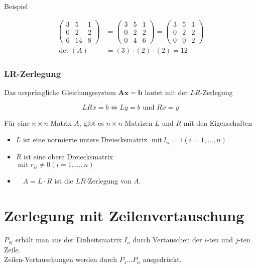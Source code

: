 Beispiel

$$
\begin{aligned}
\left(\begin{array}{ccc}
3 & 5 & 1 \\
0 & 2 & 2 \\
6 & 14 & 8
\end{array}\right) & =\left(\begin{array}{lll}
3 & 5 & 1 \\
0 & 2 & 2 \\
0 & 4 & 6
\end{array}\right)=\left(\begin{array}{lll}
3 & 5 & 1 \\
0 & 2 & 2 \\
0 & 0 & 2
\end{array}\right) \\
\operatorname{det}(A) & =(3) \cdot(2) \cdot(2)=12
\end{aligned}
$$

\subsubsection{LR-Zerlegung}

Das ursprüngliche Gleichungssystem $\boldsymbol{A} \boldsymbol{x}=\boldsymbol{b}$ lautet mit der $L R$-Zerlegung

$$
L R x=b \Leftrightarrow L y=b \text { und } R x=y
$$

Für eine $n \times n$ Matrix $A$, gibt es $n \times n$ Matrizen $L$ und $R$ mit den Eigenschaften

\begin{itemize}
  \item $L$ ist eine normierte untere Dreiecksmatrix $\operatorname{mit} l_{i i}=1(i=1, \ldots, n)$
  \item $R$ ist eine obere Dreiecksmatrix\\
$\operatorname{mit} r_{i i} \neq 0(i=1, \ldots, n)$
  \item $\quad A=L \cdot R$ ist die $L R$-Zerlegung von $A$.
\end{itemize}

\section*{Zerlegung mit Zeilenvertauschung}
$P_{K}$ erhält man aus der Einheitsmatrix $I_{n}$ durch Vertauschen der $i$-ten und $j$-ten Zeile.\\
Zeilen-Vertauschungen werden durch $P_{1} \ldots P_{n}$ ausgedrückt.

